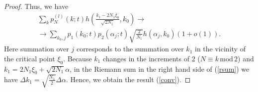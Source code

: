 \documentclass[11pt]{amsart}
\begin{document}
\begin{proof}
    Thus, we have
    \begin{eqnarray}\label{rsum}
    \sum\limits_{k} p^{(l)}_N(k;t)h\left(\frac{k_1-2N_1 \xi_0}{\sqrt{2N_1}},k_0\right)\to\\
    \to\sum\limits_{k_0,j}p_1(k_0;t)p_2(\alpha_j;t)\sqrt{\frac{2}{N_1}}h(\alpha_j,k_0)(1+o(1)).\nonumber
    \end{eqnarray}
    Here summation over $j$ corresponds to the summation over $k_1$ in the vicinity of the critical point $\xi_0$. Because $k_1$ changes in the increments of $2$ ($N\equiv k\,\mathrm{mod}\, 2$) and $k_1=2N_1\xi_0+\sqrt{2N_1}\alpha$, in the Riemann sum in the right hand side of (\ref{rsum}) we have $\Delta k_1=\sqrt{\frac{N_1}{2}}\Delta\alpha$. Hence, we obtain the result (\ref{conv}).
\end{proof}
\end{document}
